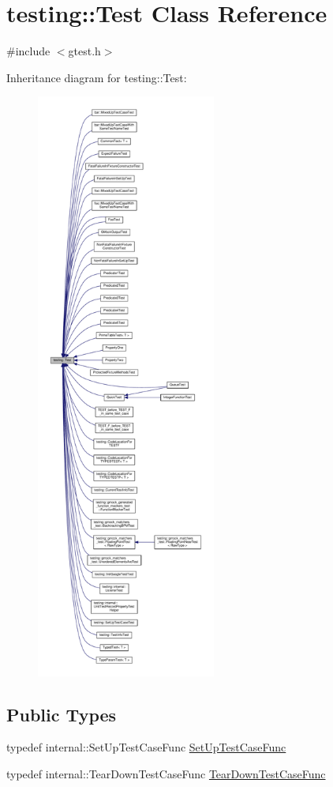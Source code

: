 \hypertarget{classtesting_1_1_test}{}\section{testing\+:\+:Test Class Reference}
\label{classtesting_1_1_test}


{\ttfamily \#include $<$gtest.\+h$>$}



Inheritance diagram for testing\+:\+:Test\+:
\nopagebreak
\begin{figure}[H]
\begin{center}
\leavevmode
\includegraphics[height=550pt]{classtesting_1_1_test__inherit__graph}
\end{center}
\end{figure}
\subsection*{Public Types}
\begin{DoxyCompactItemize}
\item 
typedef internal\+::\+Set\+Up\+Test\+Case\+Func \hyperlink{classtesting_1_1_test_a5f2a051d1d99c9b784c666c586186cf9}{Set\+Up\+Test\+Case\+Func}
\item 
typedef internal\+::\+Tear\+Down\+Test\+Case\+Func \hyperlink{classtesting_1_1_test_aa0f532e93b9f3500144c53f31466976c}{Tear\+Down\+Test\+Case\+Func}
\end{DoxyCompactItemize}
